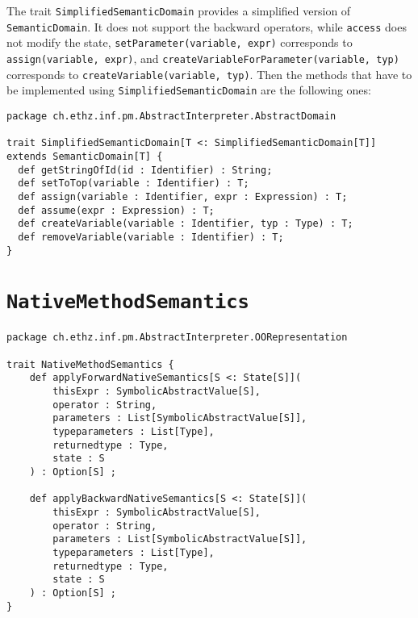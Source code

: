 \documentclass[11pt]{article}
\newcommand{\statement}[1]{\lstinline{#1}}
\begin{document}
The trait \statement{SimplifiedSemanticDomain} provides a simplified version of \statement{SemanticDomain}. It does not support the backward operators, while \statement{access} does not modify the state, \statement{setParameter(variable, expr)} corresponds to \statement{assign(variable, expr)}, and \statement{createVariableForParameter(variable, typ)} corresponds to \statement{createVariable(variable, typ)}. Then the methods that have to be implemented using \statement{SimplifiedSemanticDomain} are the following ones:


\begin{lstlisting}
package ch.ethz.inf.pm.AbstractInterpreter.AbstractDomain

trait SimplifiedSemanticDomain[T <: SimplifiedSemanticDomain[T]] extends SemanticDomain[T] {
  def getStringOfId(id : Identifier) : String;
  def setToTop(variable : Identifier) : T;
  def assign(variable : Identifier, expr : Expression) : T;
  def assume(expr : Expression) : T;
  def createVariable(variable : Identifier, typ : Type) : T;
  def removeVariable(variable : Identifier) : T;
}
\end{lstlisting}

\section{\statement{NativeMethodSemantics}}
\begin{lstlisting}
package ch.ethz.inf.pm.AbstractInterpreter.OORepresentation

trait NativeMethodSemantics {
	def applyForwardNativeSemantics[S <: State[S]](
		thisExpr : SymbolicAbstractValue[S], 
		operator : String, 
		parameters : List[SymbolicAbstractValue[S]], 
		typeparameters : List[Type], 
		returnedtype : Type, 
		state : S
	) : Option[S] ;

	def applyBackwardNativeSemantics[S <: State[S]](
		thisExpr : SymbolicAbstractValue[S], 
		operator : String, 
		parameters : List[SymbolicAbstractValue[S]], 
		typeparameters : List[Type], 
		returnedtype : Type, 
		state : S
	) : Option[S] ;
}
\end{lstlisting}
\end{document}
